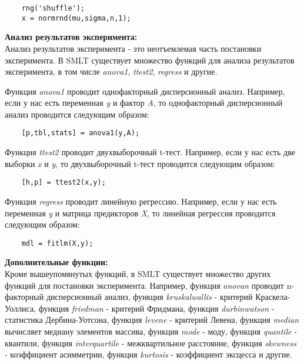 \documentclass[a4paper, 12pt]{article}%
\begin{document}
\begin{titlepage}
	\begin{lstlisting}
	rng('shuffle');
	x = normrnd(mu,sigma,n,1);
	\end{lstlisting}
	
	\textbf{Анализ результатов эксперимента:}\\
	Анализ результатов эксперимента - это неотъемлемая часть постановки эксперимента. В SMLT существует множество функций для анализа результатов эксперимента, в том числе \textit{anova1}, \textit{ttest2}, \textit{regress} и другие.

	Функция \textit{anova1} проводит однофакторный дисперсионный анализ. Например, если у нас есть переменная \textit{y} и фактор \textit{A}, то однофакторный дисперсионный анализ проводится следующим образом:\\
	
	\begin{lstlisting}
	[p,tbl,stats] = anova1(y,A);
	\end{lstlisting}
	
	Функция \textit{ttest2} проводит двухвыборочный t-тест. Например, если у нас есть две выборки \textit{x} и \textit{y}, то двухвыборочный t-тест проводится следующим образом:\\
	
	\begin{lstlisting}
	[h,p] = ttest2(x,y);
	\end{lstlisting}
	Функция \textit{regress} проводит линейную регрессию. Например, если у нас есть переменная \textit{y} и матрица предикторов \textit{X}, то линейная регрессия проводится следующим образом:\\
	
	\begin{lstlisting}
	mdl = fitlm(X,y);
	\end{lstlisting}

	\textbf{Дополнительные функции:}\\
	Кроме вышеупомянутых функций, в SMLT существует множество других функций для постановки эксперимента. Например, функция \textit{anovan} проводит n-факторный дисперсионный анализ, функция \textit{kruskalwallis} - критерий Краскела-Уоллиса, функция \textit{friedman} - критерий Фридмана, функция \textit{durbinwatson} - статистика Дербина-Уотсона, функция \textit{levene} - критерий Левена, функция \textit{median} вычисляет медиану элементов массива, функция \textit{mode} - моду, функция \textit{quantile} - квантили, функция \textit{interquartile} - межквартильное расстояние, функция \textit{skewness} - коэффициент асимметрии, функция \textit{kurtosis} - коэффициент эксцесса и другие.
	

\end{titlepage}
\end{document}
